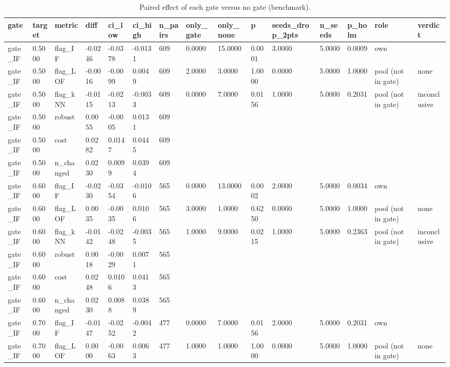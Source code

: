 \begin{table}[t]
\centering
\caption{Paired effect of each gate versus no gate (benchmark).}
\label{tab:benchmark_paired_effects}
\small
\begin{tabular}{lllllllllllllll}
\toprule
gate & target & metric & diff & ci\_low & ci\_high & n\_pairs & only\_gate & only\_none & p & seeds\_drop\_2pts & n\_seeds & p\_holm & role & verdict \\
\midrule
gate\_IF & 0.5000 & flag\_IF & -0.0246 & -0.0378 & -0.0131 & 609 & 0.0000 & 15.0000 & 0.0001 & 3.0000 & 5.0000 & 0.0009 & own &  \\
gate\_IF & 0.5000 & flag\_LOF & -0.0016 & -0.0099 & 0.0049 & 609 & 2.0000 & 3.0000 & 1.0000 & 0.0000 & 5.0000 & 1.0000 & pool (not in gate) & none \\
gate\_IF & 0.5000 & flag\_kNN & -0.0115 & -0.0213 & -0.0033 & 609 & 0.0000 & 7.0000 & 0.0156 & 1.0000 & 5.0000 & 0.2031 & pool (not in gate) & inconclusive \\
gate\_IF & 0.5000 & robust & 0.0055 & -0.0005 & 0.0131 & 609 &  &  &  &  &  &  &  &  \\
gate\_IF & 0.5000 & cost & 0.0282 & 0.0147 & 0.0445 & 609 &  &  &  &  &  &  &  &  \\
gate\_IF & 0.5000 & n\_changed & 0.0230 & 0.0099 & 0.0394 & 609 &  &  &  &  &  &  &  &  \\
gate\_IF & 0.6000 & flag\_IF & -0.0230 & -0.0354 & -0.0106 & 565 & 0.0000 & 13.0000 & 0.0002 & 2.0000 & 5.0000 & 0.0034 & own &  \\
gate\_IF & 0.6000 & flag\_LOF & 0.0035 & -0.0035 & 0.0106 & 565 & 3.0000 & 1.0000 & 0.6250 & 0.0000 & 5.0000 & 1.0000 & pool (not in gate) & none \\
gate\_IF & 0.6000 & flag\_kNN & -0.0142 & -0.0248 & -0.0035 & 565 & 1.0000 & 9.0000 & 0.0215 & 1.0000 & 5.0000 & 0.2363 & pool (not in gate) & inconclusive \\
gate\_IF & 0.6000 & robust & 0.0018 & -0.0029 & 0.0071 & 565 &  &  &  &  &  &  &  &  \\
gate\_IF & 0.6000 & cost & 0.0248 & 0.0106 & 0.0413 & 565 &  &  &  &  &  &  &  &  \\
gate\_IF & 0.6000 & n\_changed & 0.0230 & 0.0088 & 0.0389 & 565 &  &  &  &  &  &  &  &  \\
gate\_IF & 0.7000 & flag\_IF & -0.0147 & -0.0252 & -0.0042 & 477 & 0.0000 & 7.0000 & 0.0156 & 2.0000 & 5.0000 & 0.2031 & own &  \\
gate\_IF & 0.7000 & flag\_LOF & 0.0000 & -0.0063 & 0.0063 & 477 & 1.0000 & 1.0000 & 1.0000 & 0.0000 & 5.0000 & 1.0000 & pool (not in gate) & none \\

\end{tabular}
\end{table}
